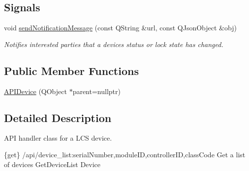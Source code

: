 \subsection*{Signals}
\begin{DoxyCompactItemize}
\item 
\mbox{\label{class_a_p_i_device_a1096381146a1c545b194d4bb63b32b8b}} 
void \hyperlink{class_a_p_i_device_a1096381146a1c545b194d4bb63b32b8b}{send\+Notification\+Message} (const Q\+String \&url, const Q\+Json\+Object \&obj)
\begin{DoxyCompactList}\small\item\em Notifies interested parties that a device\textquotesingle{}s status or lock state has changed. \end{DoxyCompactList}\end{DoxyCompactItemize}
\subsection*{Public Member Functions}
\begin{DoxyCompactItemize}
\item 
\hyperlink{class_a_p_i_device_ab983034826edbff2b4246002b22081a5}{A\+P\+I\+Device} (Q\+Object $\ast$parent=nullptr)
\end{DoxyCompactItemize}


\subsection{Detailed Description}
A\+PI handler class for a L\+CS device. 

\{get\} /api/device\+\_\+list\+:serial\+Number,module\+ID,controller\+ID,class\+Code Get a list of devices  Get\+Device\+List  Device

